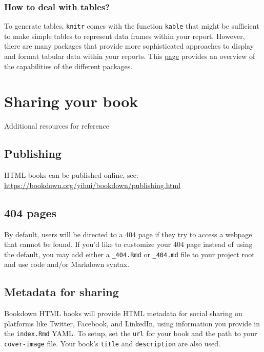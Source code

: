 \documentclass[
]{book}
\theoremstyle{definition}
\theoremstyle{definition}
\theoremstyle{definition}
\theoremstyle{definition}
\theoremstyle{remark}
\begin{document}
\hypertarget{how-to-deal-with-tables}{%
\subsection{How to deal with tables?}\label{how-to-deal-with-tables}}

To generate tables, \texttt{knitr} comes with the function \texttt{kable} that might be sufficient to make simple tables to represent data frames within your report. However, there are many packages that provide more sophisticated approaches to display and format tabular data within your reports. This \href{https://hughjonesd.github.io/huxtable/design-principles.html}{page} provides an overview of the capabilities of the different packages.

\hypertarget{sharing-your-book}{%
\chapter{Sharing your book}\label{sharing-your-book}}

Additional resources for reference

\hypertarget{publishing}{%
\section{Publishing}\label{publishing}}

HTML books can be published online, see: \url{https://bookdown.org/yihui/bookdown/publishing.html}

\hypertarget{pages}{%
\section{404 pages}\label{pages}}

By default, users will be directed to a 404 page if they try to access a webpage that cannot be found. If you'd like to customize your 404 page instead of using the default, you may add either a \texttt{\_404.Rmd} or \texttt{\_404.md} file to your project root and use code and/or Markdown syntax.

\hypertarget{metadata-for-sharing}{%
\section{Metadata for sharing}\label{metadata-for-sharing}}

Bookdown HTML books will provide HTML metadata for social sharing on platforms like Twitter, Facebook, and LinkedIn, using information you provide in the \texttt{index.Rmd} YAML. To setup, set the \texttt{url} for your book and the path to your \texttt{cover-image} file. Your book's \texttt{title} and \texttt{description} are also used.
\end{document}

